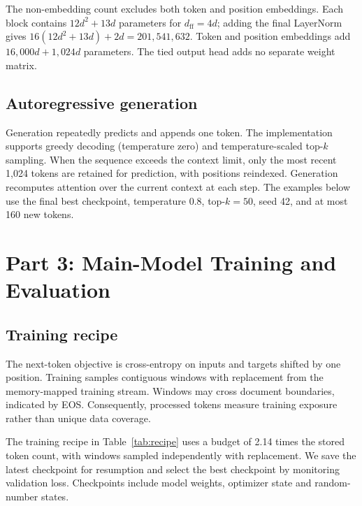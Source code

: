 \documentclass{article}
\begin{document}
The non-embedding count excludes both token and position embeddings. Each block contains $12d^2+13d$ parameters for $d_{\mathrm{ff}}=4d$; adding the final LayerNorm gives $16(12d^2+13d)+2d=201{,}541{,}632$. Token and position embeddings add $16{,}000d+1{,}024d$ parameters. The tied output head adds no separate weight matrix.

\subsection{Autoregressive generation}
Generation repeatedly predicts and appends one token. The implementation supports greedy decoding (temperature zero) and temperature-scaled top-$k$ sampling. When the sequence exceeds the context limit, only the most recent 1,024 tokens are retained for prediction, with positions reindexed. Generation recomputes attention over the current context at each step. The examples below use the final best checkpoint, temperature 0.8, top-$k=50$, seed 42, and at most 160 new tokens.

\section{Part 3: Main-Model Training and Evaluation}
\subsection{Training recipe}
The next-token objective is cross-entropy on inputs and targets shifted by one position. Training samples contiguous windows with replacement from the memory-mapped training stream. Windows may cross document boundaries, indicated by EOS. Consequently, processed tokens measure training exposure rather than unique data coverage.



The training recipe in Table~\ref{tab:recipe} uses a budget of 2.14 times the stored token count, with windows sampled independently with replacement. We save the latest checkpoint for resumption and select the best checkpoint by monitoring validation loss. Checkpoints include model weights, optimizer state and random-number states.
\end{document}
